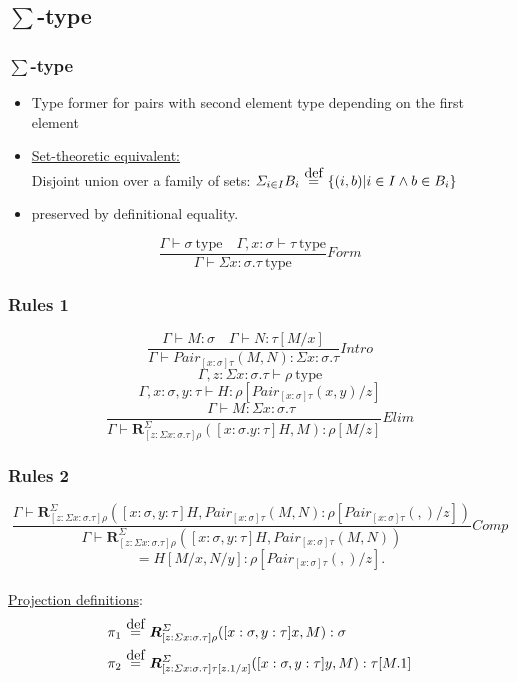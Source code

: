 \documentclass[aspectratio=169]{beamer}
\newcommand{\typ}{\ \mathrm{type}}
\newcommand{\pair}[2]{Pair_{[x:\sigma]\tau}(#1, #2)}
\newcommand{\R}[2]{\mathbold{R}_{[z:\Sigma x:\sigma.\tau]\rho}^{\Sigma}(#1, #2)}
\newcommand{\C}{Comp}
\newcommand{\Intro}{Intro}
\newcommand{\F}{Form}
\newcommand{\E}{Elim}
\newcommand\defeq{\stackrel{\mathclap{\normalfont\mbox{def}}}{\ =\ }}
\newcommand{\Gamdash}{\Gamma\vdash}
\begin{document}
    \subsection{$\sum$-type}
    \begin{frame}
        \frametitle{$\sum$-type}
        \begin{itemize}
            \item Type former for pairs with second element type depending on the first element
            \item \underline{Set-theoretic equivalent:}\\
            Disjoint union over a family of sets: $\Sigma_{i\in I}B_i \defeq \{(i,b)|i \in I \wedge b \in B_i\}$
            \item preserved by definitional equality.
        \end{itemize}
        \vspace{40pt}
        $$\frac{\Gamma \vdash \sigma \typ \quad \Gamma,x:\sigma\vdash \tau \typ}{\Gamdash \Sigma x:\sigma.\tau \typ}\F$$
    \end{frame}
    \begin{frame}
        \frametitle{Rules 1}
        $$\frac{\Gamma \vdash M : \sigma\quad \Gamma \vdash N : \tau[M/x]}{\Gamma \vdash \pair{M}{N} : \Sigma x:\sigma.\tau}\Intro$$
        \vspace{30pt}
        $$\Gamma,z:\Sigma x:\sigma.\tau \vdash \rho \typ$$
        $$\Gamma,x:\sigma,y:\tau\vdash H:\rho [\pair{x}{y}/z]$$
        $$\frac{\quad \Gamma \vdash M : \Sigma x:\sigma.\tau}{\Gamma \vdash \R{[x:\sigma.y:\tau]H}{M}:\rho[M/z]}\E$$
    \end{frame}
    \begin{frame}
        \frametitle{Rules 2}
        $$\frac{\Gamma \vdash \R{[x:\sigma,y:\tau]H}{\pair{M}{N}:\rho[\pair{}{}/z]}}{\Gamma \vdash \R{[x:\sigma,y:\tau]H}{\pair{M}{N}}}\C$$
        $$=H[M/x,N/y]:\rho[\pair{}{}/z].$$
        \vspace{5pt}\\
        \underline{Projection definitions}:
        \begin{align*}
            &\pi_1 \defeq \R{[x:\sigma,y:\tau]x}{M}:\sigma\\
            &\pi_2 \defeq \mathbold{R}^\Sigma_{[z:\Sigma x:\sigma.\tau]\tau[z.1/x]}([x:\sigma,y:\tau]y, M):\tau[M.1]\\
        \end{align*}
    \end{frame}
\end{document}
